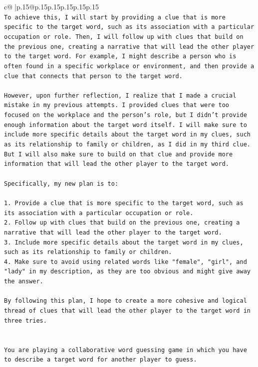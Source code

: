 \documentclass{article}
\begin{document}
{\begin{supertabular}{c@{$\;$}|p{.15\linewidth}@{}p{.15\linewidth}p{.15\linewidth}p{.15\linewidth}p{.15\linewidth}p{.15\linewidth}}
{{{\\ 
\texttt{To achieve this, I will start by providing a clue that is more specific to the target word, such as its association with a particular occupation or role. Then, I will follow up with clues that build on the previous one, creating a narrative that will lead the other player to the target word. For example, I might describe a person who is often found in a specific workplace or environment, and then provide a clue that connects that person to the target word.} \\
\\ 
\texttt{However, upon further reflection, I realize that I made a crucial mistake in my previous attempts. I provided clues that were too focused on the workplace and the person's role, but I didn't provide enough information about the target word itself. I will make sure to include more specific details about the target word in my clues, such as its relationship to family or children, as I did in my third clue. But I will also make sure to build on that clue and provide more information that will lead the other player to the target word.} \\
\\ 
\texttt{Specifically, my new plan is to:} \\
\\ 
\texttt{1. Provide a clue that is more specific to the target word, such as its association with a particular occupation or role.} \\
\texttt{2. Follow up with clues that build on the previous one, creating a narrative that will lead the other player to the target word.} \\
\texttt{3. Include more specific details about the target word in my clues, such as its relationship to family or children.} \\
\texttt{4. Make sure to avoid using related words like "female", "girl", and "lady" in my description, as they are too obvious and might give away the answer.} \\
\\ 
\texttt{By following this plan, I hope to create a more cohesive and logical thread of clues that will lead the other player to the target word in three tries.} \\
\\ 
\\ 
\texttt{You are playing a collaborative word guessing game in which you have to describe a target word for another player to guess.} \\
}}}
\end{supertabular}}
\end{document}
